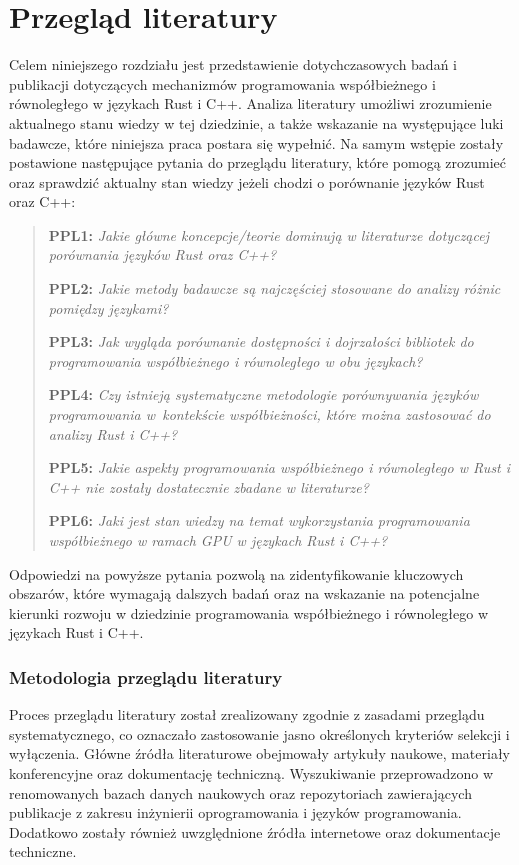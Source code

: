 \chapter{Przegląd literatury}
Celem niniejszego rozdziału jest przedstawienie dotychczasowych badań i publikacji dotyczących mechanizmów programowania współbieżnego i równoległego w językach Rust i C++. Analiza literatury umożliwi zrozumienie aktualnego stanu wiedzy w tej dziedzinie, a także wskazanie na występujące luki badawcze, które niniejsza praca postara się wypełnić.
Na samym wstępie zostały postawione następujące pytania do przeglądu literatury, które pomogą zrozumieć oraz sprawdzić aktualny stan wiedzy jeżeli chodzi o porównanie języków Rust oraz C++:

\begin{quote}
    \item \textbf{PPL1:} \emph{Jakie główne koncepcje/teorie dominują w literaturze dotyczącej porównania języków Rust oraz C++?} \label{PPL1}
    \item \textbf{PPL2:} \emph{Jakie metody badawcze są najczęściej stosowane do analizy różnic pomiędzy językami?}
    \item \textbf{PPL3:} \emph{Jak wygląda porównanie dostępności i dojrzałości bibliotek do programowania współbieżnego i równoległego w obu językach?}
    \item \textbf{PPL4:} \emph{Czy istnieją systematyczne metodologie porównywania języków programowania w~kontekście współbieżności, które można zastosować do analizy Rust i C++?}
    \item \textbf{PPL5:} \emph{Jakie aspekty programowania współbieżnego i równoległego w Rust i C++ nie zostały dostatecznie zbadane w literaturze?}
    \item \textbf{PPL6:} \emph{Jaki jest stan wiedzy na temat wykorzystania programowania współbieżnego w ramach GPU w językach Rust i C++?}
\end{quote}

Odpowiedzi na powyższe pytania pozwolą na zidentyfikowanie kluczowych obszarów, które wymagają dalszych badań oraz na wskazanie na potencjalne kierunki rozwoju w dziedzinie programowania współbieżnego i równoległego w językach Rust i C++.
\subsection{Metodologia przeglądu literatury}
Proces przeglądu literatury został zrealizowany zgodnie z zasadami przeglądu systematycznego, co oznaczało zastosowanie jasno określonych kryteriów selekcji i wyłączenia. Główne źródła literaturowe obejmowały artykuły naukowe, materiały konferencyjne oraz dokumentację techniczną. Wyszukiwanie przeprowadzono w renomowanych bazach danych naukowych oraz repozytoriach zawierających publikacje z zakresu inżynierii oprogramowania i języków programowania. Dodatkowo zostały również uwzględnione źródła internetowe oraz dokumentacje techniczne.

